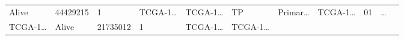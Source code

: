 \documentclass[
]{article}
\begin{document}
\begin{longtable}[]{@{}lllllllllll@{}}
\begin{minipage}[t]{0.04\columnwidth}
Alive\strut
\end{minipage} & \begin{minipage}[t]{0.06\columnwidth}\raggedright
44429215\strut
\end{minipage} & \begin{minipage}[t]{0.07\columnwidth}\raggedright
1\strut
\end{minipage} & \begin{minipage}[t]{0.07\columnwidth}\raggedright
TCGA-1\ldots{}\strut
\end{minipage} & \begin{minipage}[t]{0.07\columnwidth}\raggedright
TCGA-1\ldots{}\strut
\end{minipage} & \begin{minipage}[t]{0.07\columnwidth}\raggedright
TP\strut
\end{minipage} & \begin{minipage}[t]{0.07\columnwidth}\raggedright
Primar\ldots{}\strut
\end{minipage} & \begin{minipage}[t]{0.09\columnwidth}\raggedright
TCGA-1\ldots{}\strut
\end{minipage} & \begin{minipage}[t]{0.10\columnwidth}\raggedright
01\strut
\end{minipage} & \begin{minipage}[t]{0.03\columnwidth}\raggedright
\ldots{}\strut
\end{minipage}\tabularnewline
\begin{minipage}[t]{0.07\columnwidth}\raggedright
TCGA-1\ldots{}\strut
\end{minipage} & \begin{minipage}[t]{0.04\columnwidth}\raggedright
Alive\strut
\end{minipage} & \begin{minipage}[t]{0.06\columnwidth}\raggedright
21735012\strut
\end{minipage} & \begin{minipage}[t]{0.07\columnwidth}\raggedright
1\strut
\end{minipage} & \begin{minipage}[t]{0.07\columnwidth}\raggedright
TCGA-1\ldots{}\strut
\end{minipage} & \begin{minipage}[t]{0.07\columnwidth}\raggedright
TCGA-1\ldots{}\strut
\end{minipage} & \begin{minipage}[t]{0.07\columnwidth}\raggedright

\end{minipage}
\end{longtable}
\end{document}
